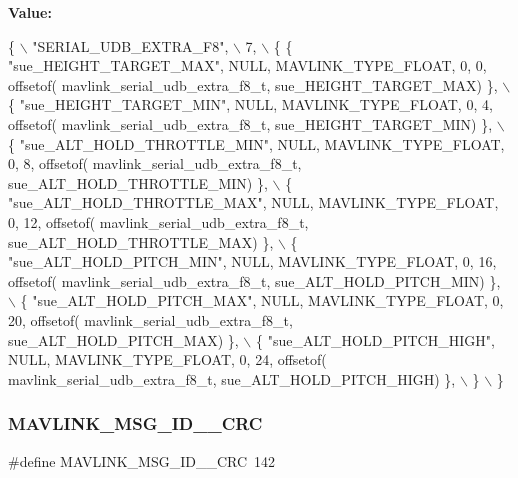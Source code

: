 {\bfseries Value\+:}
\begin{DoxyCode}
\{ \(\backslash\)
    \textcolor{stringliteral}{"SERIAL\_UDB\_EXTRA\_F8"}, \(\backslash\)
    7, \(\backslash\)
    \{  \{ \textcolor{stringliteral}{"sue\_HEIGHT\_TARGET\_MAX"}, NULL, MAVLINK_TYPE_FLOAT, 0, 0, offsetof(
      mavlink_serial_udb_extra_f8_t, sue\_HEIGHT\_TARGET\_MAX) \}, \(\backslash\)
         \{ \textcolor{stringliteral}{"sue\_HEIGHT\_TARGET\_MIN"}, NULL, MAVLINK_TYPE_FLOAT, 0, 4, offsetof(
      mavlink_serial_udb_extra_f8_t, sue\_HEIGHT\_TARGET\_MIN) \}, \(\backslash\)
         \{ \textcolor{stringliteral}{"sue\_ALT\_HOLD\_THROTTLE\_MIN"}, NULL, MAVLINK_TYPE_FLOAT, 0, 8, offsetof(
      mavlink_serial_udb_extra_f8_t, sue\_ALT\_HOLD\_THROTTLE\_MIN) \}, \(\backslash\)
         \{ \textcolor{stringliteral}{"sue\_ALT\_HOLD\_THROTTLE\_MAX"}, NULL, MAVLINK_TYPE_FLOAT, 0, 12, offsetof(
      mavlink_serial_udb_extra_f8_t, sue\_ALT\_HOLD\_THROTTLE\_MAX) \}, \(\backslash\)
         \{ \textcolor{stringliteral}{"sue\_ALT\_HOLD\_PITCH\_MIN"}, NULL, MAVLINK_TYPE_FLOAT, 0, 16, offsetof(
      mavlink_serial_udb_extra_f8_t, sue\_ALT\_HOLD\_PITCH\_MIN) \}, \(\backslash\)
         \{ \textcolor{stringliteral}{"sue\_ALT\_HOLD\_PITCH\_MAX"}, NULL, MAVLINK_TYPE_FLOAT, 0, 20, offsetof(
      mavlink_serial_udb_extra_f8_t, sue\_ALT\_HOLD\_PITCH\_MAX) \}, \(\backslash\)
         \{ \textcolor{stringliteral}{"sue\_ALT\_HOLD\_PITCH\_HIGH"}, NULL, MAVLINK_TYPE_FLOAT, 0, 24, offsetof(
      mavlink_serial_udb_extra_f8_t, sue\_ALT\_HOLD\_PITCH\_HIGH) \}, \(\backslash\)
         \} \(\backslash\)
\}
\end{DoxyCode}
\mbox{\label{mavlink__msg__serial__udb__extra__f8_8h_a4c282073862c1abf9bd79d9c1f84d8cc}} 
\subsubsection{M\+A\+V\+L\+I\+N\+K\+\_\+\+M\+S\+G\+\_\+\+I\+D\+\_\+\_\+\+C\+RC}
{\footnotesize\ttfamily \#define M\+A\+V\+L\+I\+N\+K\+\_\+\+M\+S\+G\+\_\+\+I\+D\+\_\+\_\+\+C\+RC~142}

